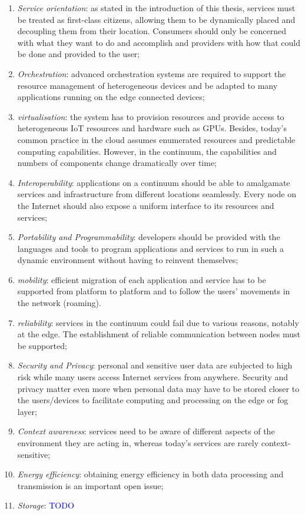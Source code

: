\documentclass{ieeeaccess}
\begin{document}
\begin{enumerate}
    \item \emph{Service orientation}: as stated in the introduction of this thesis, services must be treated as first-class citizens, allowing them to be dynamically placed and decoupling them from their location. Consumers should only be concerned with what they want to do and accomplish and providers with how that could be done and provided to the user;
    \item \emph{Orchestration}: advanced orchestration systems are required to support the resource management of heterogeneous devices and be adapted to many applications running on the edge connected devices;
    \item \emph{virtualisation}: the system has to provision resources and provide access to heterogeneous IoT resources and hardware such as GPUs. Besides, today's common practice in the cloud assumes enumerated resources and predictable computing capabilities. However, in the continuum, the capabilities and numbers of components change dramatically over time;
    \item \emph{Interoperability}: applications on a continuum should be able to amalgamate services and infrastructure from different locations seamlessly. Every node on the Internet should also expose a uniform interface to its resources and services;
    \item \emph{Portability and Programmability}: developers should be provided with the languages and tools to program applications and services to run in such a dynamic environment without having to reinvent themselves;
    \item \emph{mobility}: efficient migration of each application and service has to be supported from platform to platform and to follow the users’ movements in the network (roaming).
    \item \emph{reliability}: services in the continuum could fail due to various reasons, notably at the edge. The establishment of reliable communication between nodes must be supported;
    \item \emph{Security and Privacy}: personal and sensitive user data are subjected to high risk while many users access Internet services from anywhere. Security and privacy matter even more when personal data may have to be stored closer to the users/devices to facilitate computing and processing on the edge or fog layer;
    \item \emph{Context awareness}: services need to be aware of different aspects of the environment they are acting in, whereas today's services are rarely context-sensitive;
    \item \emph{Energy efficiency}: obtaining energy efficiency in both data processing and transmission is an important open issue;
    \item \emph{Storage}: \textcolor{blue}{TODO}
\end{enumerate}
\end{document}

